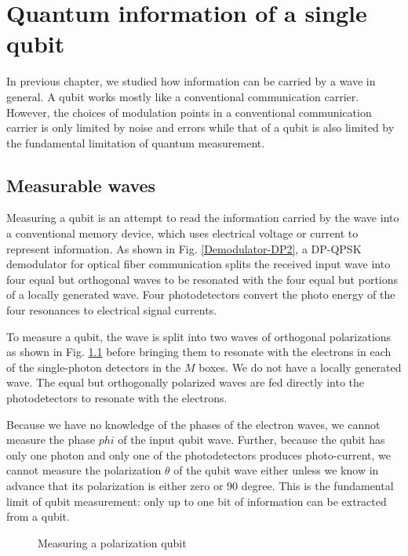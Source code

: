 \documentclass[oneside, letter, 12pt]{book}
\begin{document}
\chapter{Quantum information of a single qubit}\label{c-qinfo}
In previous chapter, we studied how information can be carried by a wave in general. A qubit works mostly like a conventional communication carrier. However, the choices of modulation points in a conventional communication carrier is only limited by noise and errors while that of a qubit is also limited by the fundamental limitation of quantum measurement.

\section{Measurable waves}
Measuring a qubit is an attempt to read the information carried by the wave into a conventional memory device, which uses electrical voltage or current to represent information. As shown in Fig. \ref{Demodulator-DP2}, a DP-QPSK demodulator for optical fiber communication splits the received input wave into four equal but orthogonal waves to be resonated with the four equal but portions of a locally generated wave. Four photodetectors convert the photo energy of the four resonances to electrical signal currents.

To measure a qubit, the wave is split into two waves of orthogonal polarizations as shown in Fig. \ref{Demodulator-DP1} before bringing them to resonate with the electrons in each of the single-photon detectors in the $M$ boxes. We do not have a locally generated wave. The equal but orthogonally polarized waves are fed directly into the photodetectors to resonate with the electrons.

Because we have no knowledge of the phases of the electron waves, we cannot measure the phase $phi$ of the input qubit wave. Further, because the qubit has only one photon and only one of the photodetectors produces photo-current, we cannot measure the polarization $\theta$ of the qubit wave either unless we know in advance that its polarization is either zero or $90$ degree. This is the fundamental limit of qubit measurement: only up to one bit of information can be extracted from a qubit.

\begin{figure}\label{Demodulator-DP1}
    \caption{Measuring a polarization qubit}
\end{figure}
\end{document}
